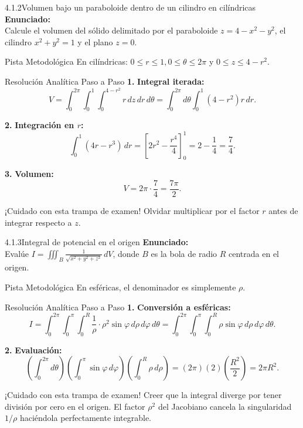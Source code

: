 \documentclass[11pt,a4paper]{article}
\begin{document}
\begin{nivelbox}{4.1.2}{Volumen bajo un paraboloide dentro de un cilindro en cilíndricas}
\textbf{Enunciado:}\\
Calcule el volumen del sólido delimitado por el paraboloide $z = 4 - x^2 - y^2$, el cilindro $x^2 + y^2 = 1$ y el plano $z = 0$.

\begin{observacionbox}{Pista Metodológica}
En cilíndricas: $0 \le r \le 1, 0 \le \theta \le 2\pi$ y $0 \le z \le 4 - r^2$.
\end{observacionbox}

\begin{ejerciciobox}{Resolución Analítica Paso a Paso}
\smallskip\noindent\textbf{1.} \textbf{Integral iterada:}
\[V = \int_0^{2\pi} \int_0^1 \int_0^{4-r^2} r \, dz \, dr \, d\theta = \int_0^{2\pi} d\theta \int_0^1 (4 - r^2) r \, dr.\]

\smallskip\noindent\textbf{2.} \textbf{Integración en $r$:}
\[\int_0^1 (4r - r^3) \, dr = \left[ 2r^2 - \frac{r^4}{4} \right]_0^1 = 2 - \frac{1}{4} = \frac{7}{4}.\]

\smallskip\noindent\textbf{3.} \textbf{Volumen:}
\[V = 2\pi \cdot \frac{7}{4} = \frac{7\pi}{2}.\]
\end{ejerciciobox}

\begin{errorbox}{¡Cuidado con esta trampa de examen!}
Olvidar multiplicar por el factor $r$ antes de integrar respecto a $z$.
\end{errorbox}
\end{nivelbox}
\bigskip

\begin{nivelbox}{4.1.3}{Integral de potencial en el origen}
\textbf{Enunciado:}\\
Evalúe $I = \iiint_B \frac{1}{\sqrt{x^2 + y^2 + z^2}} \, dV$, donde $B$ es la bola de radio $R$ centrada en el origen.

\begin{observacionbox}{Pista Metodológica}
En esféricas, el denominador es simplemente $\rho$.
\end{observacionbox}

\begin{ejerciciobox}{Resolución Analítica Paso a Paso}
\smallskip\noindent\textbf{1.} \textbf{Conversión a esféricas:}
\[I = \int_0^{2\pi} \int_0^\pi \int_0^R \frac{1}{\rho} \cdot \rho^2 \sin\varphi \, d\rho \, d\varphi \, d\theta = \int_0^{2\pi} \int_0^\pi \int_0^R \rho \sin\varphi \, d\rho \, d\varphi \, d\theta.\]

\smallskip\noindent\textbf{2.} \textbf{Evaluación:}
\[\left( \int_0^{2\pi} d\theta \right) \left( \int_0^\pi \sin\varphi \, d\varphi \right) \left( \int_0^R \rho \, d\rho \right) = (2\pi)(2)\left( \frac{R^2}{2} \right) = 2\pi R^2.\]
\end{ejerciciobox}

\begin{errorbox}{¡Cuidado con esta trampa de examen!}
Creer que la integral diverge por tener división por cero en el origen. El factor $\rho^2$ del Jacobiano cancela la singularidad $1/\rho$ haciéndola perfectamente integrable.
\end{errorbox}
\end{nivelbox}
\bigskip
\end{document}
